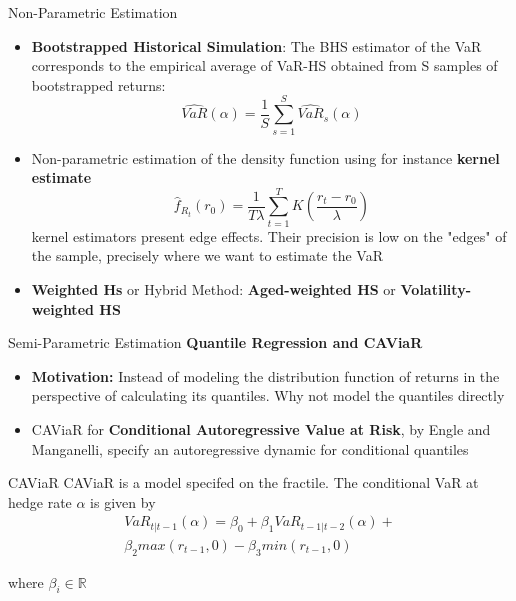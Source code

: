 \documentclass{beamer}
\def\R{\mathbb{R}}
\newcommand{\imfbold}[1]{\textbf{\textcolor{imfblue}{#1}}}
\begin{document}
\begin{frame}{Non-Parametric Estimation}
    \begin{itemize}
        \item \textbf{Bootstrapped Historical Simulation}: The BHS estimator of the VaR corresponds to the empirical average of VaR-HS obtained from S samples of bootstrapped returns:
        $$\hat{VaR}(\alpha) = \frac{1}{S}\sum_{s=1}^{S} \hat{VaR}_s(\alpha) $$
        
        \item Non-parametric estimation of the density function using for instance \textbf{kernel estimate}
        $$\hat{f}_{R_t}(r_0) = \frac{1}{T\lambda} \sum_{t=1}^T{K\left(\frac{r_t-r_0}{\lambda} \right)}$$
        kernel estimators present edge effects. Their precision is low on the "edges" of the sample, precisely where we want to estimate the VaR
        
        \item \textbf{Weighted Hs} or Hybrid Method: \textbf{Aged-weighted HS} or \textbf{Volatility-weighted HS} 
    \end{itemize}
\end{frame}
\begin{frame}{Semi-Parametric Estimation}
    \imfbold{Quantile Regression and CAViaR}
    \begin{itemize}
        \item \textbf{Motivation:} Instead of modeling the distribution function of returns in the perspective of  calculating its quantiles. Why not model the quantiles directly  
        \item CAViaR for \textbf{Conditional Autoregressive Value at Risk}, by Engle and Manganelli, specify an autoregressive dynamic for conditional quantiles
    \end{itemize}
    

    \begin{block}{CAViaR}
        CAViaR is a model specifed on the fractile. The conditional VaR at hedge rate $\alpha$ is given by 
        \begin{align*}
          VaR_{t|t-1}(\alpha) = \beta_0 + \beta_1VaR_{t-1|t-2}(\alpha) +\\ \beta_2 max(r_{t-1},0) - \beta_3 min(r_{t-1},0)   
        \end{align*}
        
        where $\beta_i \in\R$ 
    \end{block}
\end{frame}
\end{document}
